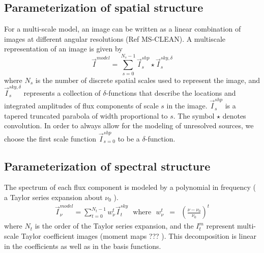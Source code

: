 \documentclass[structabstract]{stylefiles/aa}
\newcommand{\nuno}{{\left(\frac{\nu}{\nu_0}\right)}}
\newcommand{\dnuno}{{\left(\frac{\nu-\nu_0}{\nu_0}\right)}}
\newcommand{\F}{{\tens{F}}}
\newcommand{\T}{{\tens{T}}}
\newcommand{\wnt}{{w_{\nu}^t}}
\begin{document}
\subsection{Parameterization of spatial structure}
For a multi-scale model, an image can be written as a linear combination of images
at different angular resolutions (Ref MS-CLEAN).
A multiscale representation of an image is given by 
\begin{equation}
\vec{I}^{model} = \sum_{s=0}^{N_s-1}  \vec{I}^{shp}_{s} \star \vec{I}^{sky,\delta}_s
\label{Eq:ms_model}
\end{equation}
where $N_s$ is the number of discrete spatial scales used to represent the image, and
$\vec{I}^{sky,\delta}_{s}$ represents a collection of $\delta$-functions that describe the locations
and integrated amplitudes of flux components of scale $s$ in the image.
$\vec{I}^{shp}_s$ is a tapered truncated parabola of width proportional to $s$.
The symbol $\star$ denotes convolution. 
In order to always allow for the modeling of unresolved sources, 
we choose the first scale function $\vec{I}^{shp}_{s=0}$ to be a $\delta$-function.

\subsection{Parameterization of spectral structure}\label{Sec:freqmodel}
The spectrum of each flux component is modeled by a polynomial in frequency
( a Taylor series expansion about $\nu_0$ ).
\begin{eqnarray}
\label{Eq:mf_model}
\vec{I}^{model}_{\nu} = \sum_{t=0}^{N_t-1} \wnt \vec{I}^{sky}_{t} ~~~\mathrm{where}~~~ \wnt&=&\dnuno^t 
\end{eqnarray}
where $N_t$ is the order of the Taylor series expansion, and 
the $I^m_t$ represent multi-scale Taylor coefficient images (moment maps ??? ).
This decomposition is linear in the coefficients as well as in the basis functions.
\end{document}
